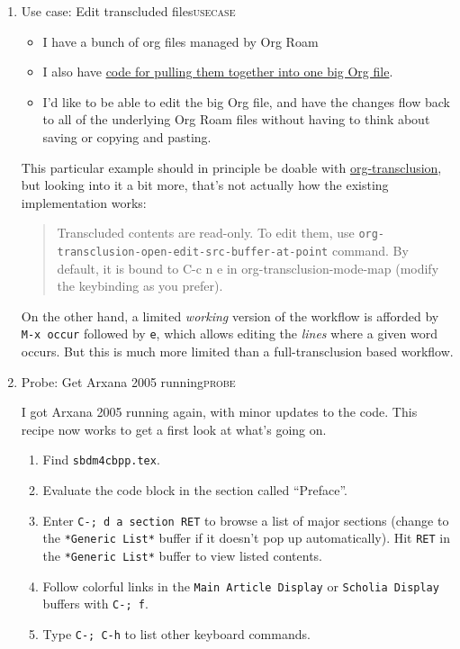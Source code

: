 \documentclass[11pt]{article}
\begin{document}
\begin{enumerate}
\item Use case: Edit transcluded files\hfill{}\textsc{usecase}
\label{sec:orga36ea3e}

\begin{itemize}
\item I have a bunch of org files managed by Org Roam
\item I also have \href{https://github.com/exp2exp/exp2exp.github.io/blob/master/src/manual/org-roam-manual.el}{code for pulling them together into one big Org file}.
\item I'd like to be able to edit the big Org file, and have the changes flow back to all of the underlying Org Roam files without having to think about saving or copying and pasting.
\end{itemize}

This particular example should in principle be doable with \href{https://github.com/nobiot/org-transclusion}{org-transclusion}, but looking into it a bit more, that’s not actually how the existing implementation works:

\begin{quote}
Transcluded contents are read-only. To edit them, use
\texttt{org-transclusion-open-edit-src-buffer-at-point} command. By default, it
is bound to C-c n e in org-transclusion-mode-map (modify the
keybinding as you prefer).
\end{quote}

On the other hand, a limited \emph{working} version of the workflow is
afforded by \texttt{M-x occur} followed by \texttt{e}, which allows editing the \emph{lines}
where a given word occurs.  But this is much more limited than
a full-transclusion based workflow.


\item Probe: Get Arxana 2005 running\hfill{}\textsc{probe}
\label{sec:orgd4c410e}

I got Arxana 2005 running again, with minor updates to the code.
This recipe now works to get a first look at what’s going on.

\begin{enumerate}
\item Find \texttt{sbdm4cbpp.tex}.
\item Evaluate the code block in the section called “Preface”.
\item Enter \texttt{C-; d a section RET} to browse a list of major sections (change to the \texttt{*Generic List*} buffer if it doesn’t pop up automatically).  Hit \texttt{RET} in the  \texttt{*Generic List*} buffer to view listed contents.
\item Follow colorful links in the \texttt{Main Article Display} or \texttt{Scholia Display} buffers with \texttt{C-; f}.
\item Type \texttt{C-; C-h} to list other keyboard commands.
\end{enumerate}


\end{enumerate}
\end{document}
